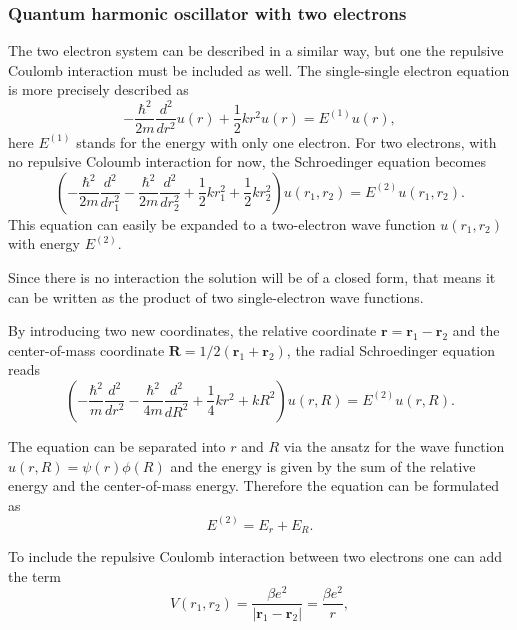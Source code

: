 \documentclass[%
reprint,
amsmath, 
amssymb, 
aps,]{revtex4-1}
\begin{document}
		\subsubsection{Quantum harmonic oscillator with two electrons} \noindent 
The two electron system can be described in a similar way, but one the repulsive Coulomb interaction must be included as well. The single-single electron equation is more precisely described as
			\begin{equation*}
    -\frac{\hbar^2}{2m}\frac{d^2}{dr^2}u(r)+\frac{1}{2}kr^2u(r) = E^{(1)}u(r),
			\end{equation*}
here $E^{(1)}$ stands for the energy with only one electron. For two electrons, with no repulsive Coloumb interaction for now, the Schroedinger equation becomes
			\begin{equation*}
    \left(-\frac{\hbar^2}{2m}\frac{d^2}{dr^2_1}-\frac{\hbar^2}{2m}\frac{d^2}{dr^2_2}+\frac{1}{2}kr^2_1+\frac{1}{2}kr^2_2\right)u(r_1,r_2) = E^{(2)}u(r_1,r_2).
			\end{equation*}
This equation can easily be expanded to a two-electron wave function $u(r_1,r_2)$ with energy $E^{(2)}$.\par
Since there is no interaction the solution will be of a closed form, that means it can be written as the product of two single-electron wave functions.\par
By introducing two new coordinates, the relative coordinate $\bm{r}=\bm{r}_1-\bm{r}_2$ and the center-of-mass coordinate $\bm{R}=1/2(\bm{r}_1+\bm{r}_2)$, the radial Schroedinger equation reads
			\begin{equation*}
    \left(-\frac{\hbar^2}{m}\frac{d^2}{dr^2}-\frac{\hbar^2}{4m}\frac{d^2}{dR^2}+\frac{1}{4}kr^2+kR^2\right)u(r,R) = E^{(2)}u(r,R).
			\end{equation*}
\par The equation can be separated into $r$ and $R$ via the ansatz for the wave function $u(r,R)=\psi(r)\phi(R)$ and the energy is given by the sum of the relative energy and the center-of-mass energy. Therefore the equation can be formulated as
			\begin{equation*}
    E^{(2)} = E_r+E_R.
			\end{equation*}
\par To include the repulsive Coulomb interaction between two electrons one can add the term
			\begin{equation*}
    V(r_1,r_2) = \frac{\beta e^2}{|\bm{r}_1-\bm{r}_2|} = \frac{\beta e^2}{r},
			\end{equation*}
\end{document}
